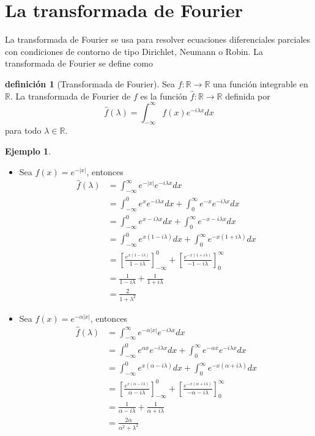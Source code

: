 \documentclass[11pt]{book}
\theoremstyle{plain}
\theoremstyle{definition}
\newtheorem{defi}[proposición]{definición}
\newtheorem{ejemplo}[proposición]{Ejemplo}
\newcommand{\R}{\mathbb{R}}
\begin{document}
\section{La transformada de Fourier}

La transformada de Fourier se usa para resolver ecuaciones diferenciales parciales con condiciones de contorno de tipo Dirichlet, Neumann o Robin. La transformada de Fourier se define como

\begin{defi}[Transformada de Fourier]
    Sea $f: \R \to \R$ una función integrable en $\R$. La transformada de Fourier de $f$ es la función $\hat{f}: \R \to \R$ definida por
    \[
        \hat{f}(\lambda) = \int_{-\infty}^{\infty} f(x)e^{-i\lambda x}dx
    \]
    para todo $\lambda \in \R$.
\end{defi}

\begin{ejemplo}
    \begin{itemize}
        \item Sea $f(x) = e^{-|x|}$, entonces
        \begin{align*}
            \hat{f}(\lambda) &= \int_{-\infty}^{\infty} e^{-|x|}e^{-i\lambda x}dx\\
            &= \int_{-\infty}^{0} e^{x}e^{-i\lambda x}dx + \int_{0}^{\infty} e^{-x}e^{-i\lambda x}dx\\
            &= \int_{-\infty}^{0} e^{x-i\lambda x}dx + \int_{0}^{\infty} e^{-x-i\lambda x}dx\\
            &= \int_{-\infty}^{0} e^{x(1-i\lambda)}dx + \int_{0}^{\infty} e^{-x(1+i\lambda)}dx\\
            &= \left[\frac{e^{x(1-i\lambda)}}{1-i\lambda}\right]_{-\infty}^{0} + \left[\frac{e^{-x(1+i\lambda)}}{-1-i\lambda}\right]_{0}^{\infty}\\
            &= \frac{1}{1-i\lambda} + \frac{1}{1+i\lambda}\\
            &= \frac{2}{1+\lambda^{2}}
        \end{align*}
        \item Sea $f(x) = e^{-\alpha |x|}$, entonces
        \begin{align*}
            \hat{f}(\lambda) &= \int_{-\infty}^{\infty} e^{-\alpha |x|}e^{-i\lambda x}dx\\
            &= \int_{-\infty}^{0} e^{\alpha x}e^{-i\lambda x}dx + \int_{0}^{\infty} e^{-\alpha x}e^{-i\lambda x}dx\\
            &= \int_{-\infty}^{0} e^{x(\alpha-i\lambda)}dx + \int_{0}^{\infty} e^{-x(\alpha+i\lambda)}dx\\
            &= \left[\frac{e^{x(\alpha-i\lambda)}}{\alpha-i\lambda}\right]_{-\infty}^{0} + \left[\frac{e^{-x(\alpha+i\lambda)}}{-\alpha-i\lambda}\right]_{0}^{\infty}\\
            &= \frac{1}{\alpha-i\lambda} + \frac{1}{\alpha+i\lambda}\\  
            &= \frac{2\alpha}{\alpha^{2}+\lambda^{2}}
        \end{align*}
    \end{itemize}
\end{ejemplo}
\end{document}
